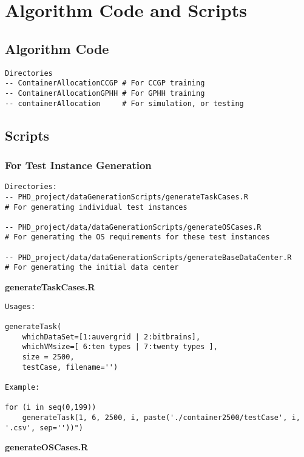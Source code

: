 \section{Algorithm Code and Scripts}
\subsection{Algorithm Code}

\begin{lstlisting}
Directories
-- ContainerAllocationCCGP # For CCGP training
-- ContainerAllocationGPHH # For GPHH training
-- containerAllocation 	   # For simulation, or testing
\end{lstlisting}


\subsection{Scripts}
\subsubsection{For Test Instance Generation}
\begin{lstlisting}
Directories:
-- PHD_project/dataGenerationScripts/generateTaskCases.R          
# For generating individual test instances

-- PHD_project/data/dataGenerationScripts/generateOSCases.R       
# For generating the OS requirements for these test instances

-- PHD_project/data/dataGenerationScripts/generateBaseDataCenter.R  
# For generating the initial data center
\end{lstlisting}


\begin{flushleft}\textbf{generateTaskCases.R}\end{flushleft}

\begin{lstlisting}
Usages:

generateTask(
	whichDataSet=[1:auvergrid | 2:bitbrains], 
	whichVMsize=[ 6:ten types | 7:twenty types ], 
	size = 2500, 
	testCase, filename='')

Example: 

for (i in seq(0,199)) 
	generateTask(1, 6, 2500, i, paste('./container2500/testCase', i, '.csv', sep=''))")
\end{lstlisting}


\begin{flushleft}\textbf{generateOSCases.R}\end{flushleft}

